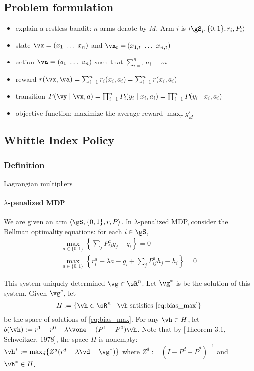 \subsection{Problem formulation}
\label{subsec:restless_pb_formul}

\begin{itemize}
    \item explain a restless bandit: $n$ arms denote by $M$, Arm $i$ is $\langle\gS_i, \{0,1\}, r_i,P_i\rangle$
    \item state $\vx=(x_1\ \dots\ x_n)$ and $\vx_t=(x_{1,t}\ \dots\ x_{n,t})$
    \item action $\va=(a_1\ \dots\ a_n)$ such that $\sum_{i=1}^{n}a_i =m$
    \item reward $r(\vx, \va)=\sum_{i=1}^n r_i(x_i,a_i) =\sum_{i=1}^n r(x_i,a_i)$
    \item transition $P(\vy \mid\vx,a)=\prod_{i=1}^nP_i(y_i \mid x_i,a_i)=\prod_{i=1}^n P(y_i \mid x_i,a_i)$
    \item objective function: maximize the average reward $\max_{\pi}g^\pi_M$ 
\end{itemize}


\subsection{Whittle Index Policy}
\label{subsec:whittle_idx}

\subsubsection{Definition}

Lagrangian multipliers

\paragraph{$\lambda$-penalized MDP}

We are given an arm $\langle\gS,\{0,1\},r,P\rangle$. In $\lambda$-penalized MDP, consider the Bellman optimality equations: for each $i\in\gS$,
\begin{align}
    \max_{a\in\{0,1\}}{\left\{\sum_jP^a_{ij}g_j-g_i\right\}} =0 \label{eq:gain_max}\\
\max_{a\in\{0,1\}}{\left\{r^a_i-\lambda a-g_i +\sum_jP^a_{ij}h_j-h_i\right\}} =0 \label{eq:bias_max}
\end{align}

This system uniquely determined $\vg\in\sR^n$.
Let $\vg^*$ is be the solution of this system. Given $\vg^*$, let
\begin{align}
H:=\{\vh\in \sR^n \mid \vh \text{ satisfies } \eqref{eq:bias_max}\}
\end{align}
be the space of solutions of \eqref{eq:bias_max}.
For any $\vh\in H$, let $b(\vh):=r^1-r^0-\lambda \vone +(P^1-P^0)\vh$. 
Note that by [Theorem 3.1, Schweitzer, 1978], the space $H$ is nonempty: $\vh^*:=\max_d\{Z^d(r^d -\lambda \vd -\vg^*)\}$ where $Z^d:=(I-P^d +\bar{P}^d)^{-1}$ and $\vh^*\in H$.

